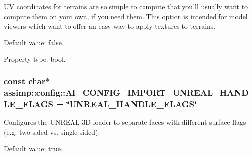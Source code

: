 U\+V coordinates for terrains are so simple to compute that you'll usually want to compute them on your own, if you need them. This option is intended for model viewers which want to offer an easy way to apply textures to terrains.

Default value\+: false.

Property type\+: bool. \hypertarget{namespaceassimp_1_1config_ad6777325b39ed97328ccdc4e69d420e8}{
\subsubsection[{A\+I\+\_\+\+C\+O\+N\+F\+I\+G\+\_\+\+I\+M\+P\+O\+R\+T\+\_\+\+U\+N\+R\+E\+A\+L\+\_\+\+H\+A\+N\+D\+L\+E\+\_\+\+F\+L\+A\+G\+S}]{\setlength{\rightskip}{0pt plus 5cm}const char$\ast$ assimp\+::config\+::\+A\+I\+\_\+\+C\+O\+N\+F\+I\+G\+\_\+\+I\+M\+P\+O\+R\+T\+\_\+\+U\+N\+R\+E\+A\+L\+\_\+\+H\+A\+N\+D\+L\+E\+\_\+\+F\+L\+A\+G\+S = \char`\"{}U\+N\+R\+E\+A\+L\+\_\+\+H\+A\+N\+D\+L\+E\+\_\+\+F\+L\+A\+G\+S\char`\"{}}}\label{namespaceassimp_1_1config_ad6777325b39ed97328ccdc4e69d420e8}
Configures the U\+N\+R\+E\+A\+L 3\+D loader to separate faces with different surface flags (e.\+g. two-\/sided vs. single-\/sided).

Default value\+: true.

